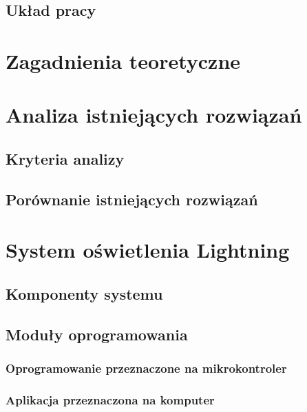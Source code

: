 \documentclass[12pt]{report}
\begin{document}
\section{Układ pracy}

\chapter[Zagadnienia teoretyczne]{Zagadnienia teoretyczne}

\chapter[Analiza istniejących rozwiązań]{Analiza istniejących rozwiązań}

\section{Kryteria analizy}

\section{Porównanie istniejących rozwiązań}

\chapter{System oświetlenia Lightning}




\section{Komponenty systemu}

\section{Moduły oprogramowania}

\subsection{Oprogramowanie przeznaczone na mikrokontroler}

\subsection{Aplikacja przeznaczona na komputer}
\end{document}
